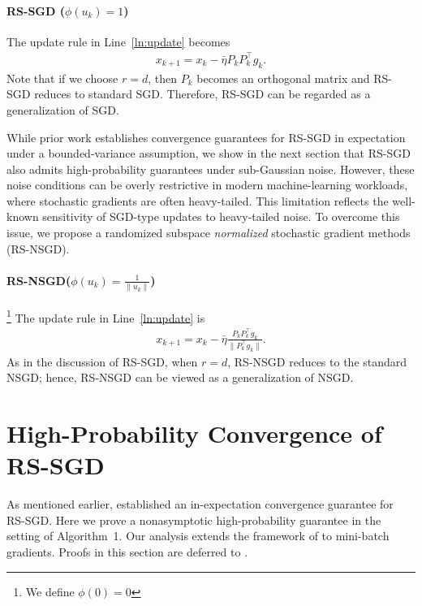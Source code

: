 \documentclass[10pt]{article}
\begin{document}
\paragraph{RS-SGD ($\phi(u_k)=1$)}
The update rule in Line~\ref{ln:update} becomes
\begin{align}
x_{k+1} = x_k - \bar{\eta} P_k P_k^\top g_k.
\label{eq:update_RS-SGD}
\end{align}
Note that if we choose $r = d$, then $P_k$ becomes an orthogonal matrix
and RS-SGD reduces to standard SGD. Therefore, RS-SGD can be regarded as a generalization of SGD.

While prior work \cite{flynn2024} establishes convergence guarantees for RS-SGD in expectation under a bounded-variance assumption, we show in the next section that RS-SGD also admits high-probability guarantees under sub-Gaussian noise.
However, these noise conditions can be overly restrictive in modern machine-learning workloads, where stochastic gradients are often heavy-tailed.
This limitation reflects the well-known sensitivity of SGD-type updates to heavy-tailed noise. To overcome this issue, we propose a randomized subspace \emph{normalized} stochastic gradient methods (RS-NSGD). 

\paragraph{RS-NSGD($\phi(u_k)=\frac{1}{\|u_k\|}$)}\footnote{We define $\phi(0)=0$}
The update rule in Line~\ref{ln:update} is
\begin{align*}
x_{k+1} = x_k - \bar{\eta} \frac{P_k P_k^\top g_k}{\|P_k^\top g_k\|}.
\end{align*}
As in the discussion of RS-SGD, when 
$r = d$, RS-NSGD reduces to the standard NSGD; hence, RS-NSGD can be viewed as a generalization of NSGD.

\section{High-Probability Convergence of RS-SGD}

As mentioned earlier, \citet{flynn2024} established an in-expectation convergence guarantee for RS-SGD.
Here we prove a nonasymptotic high-probability guarantee in the setting of Algorithm~1.
Our analysis extends the framework of \citet{liu2023hp} to mini-batch gradients.
Proofs in this section are deferred to .
\end{document}
